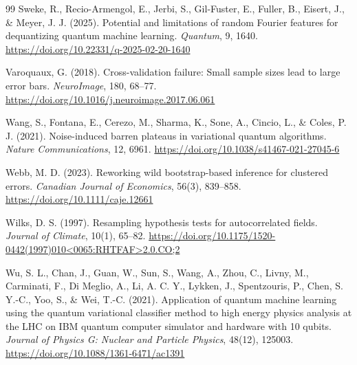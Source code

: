 \documentclass[11pt,a4paper]{article}
\begin{document}
\begin{thebibliography}{99}
Sweke, R., Recio-Armengol, E., Jerbi, S., Gil-Fuster, E., Fuller, B., Eisert, J., \& Meyer, J. J. (2025). Potential and limitations of random Fourier features for dequantizing quantum machine learning. \textit{Quantum}, 9, 1640. \url{https://doi.org/10.22331/q-2025-02-20-1640}

Varoquaux, G. (2018). Cross-validation failure: Small sample sizes lead to large error bars. \textit{NeuroImage}, 180, 68--77. \url{https://doi.org/10.1016/j.neuroimage.2017.06.061}

Wang, S., Fontana, E., Cerezo, M., Sharma, K., Sone, A., Cincio, L., \& Coles, P. J. (2021). Noise-induced barren plateaus in variational quantum algorithms. \textit{Nature Communications}, 12, 6961. \url{https://doi.org/10.1038/s41467-021-27045-6}

Webb, M. D. (2023). Reworking wild bootstrap-based inference for clustered errors. \textit{Canadian Journal of Economics}, 56(3), 839--858. \url{https://doi.org/10.1111/caje.12661}

Wilks, D. S. (1997). Resampling hypothesis tests for autocorrelated fields. \textit{Journal of Climate}, 10(1), 65--82. \url{https://doi.org/10.1175/1520-0442(1997)010<0065:RHTFAF>2.0.CO;2}

Wu, S. L., Chan, J., Guan, W., Sun, S., Wang, A., Zhou, C., Livny, M., Carminati, F., Di Meglio, A., Li, A. C. Y., Lykken, J., Spentzouris, P., Chen, S. Y.-C., Yoo, S., \& Wei, T.-C. (2021). Application of quantum machine learning using the quantum variational classifier method to high energy physics analysis at the LHC on IBM quantum computer simulator and hardware with 10 qubits. \textit{Journal of Physics G: Nuclear and Particle Physics}, 48(12), 125003. \url{https://doi.org/10.1088/1361-6471/ac1391}

\end{thebibliography}
\end{document}
